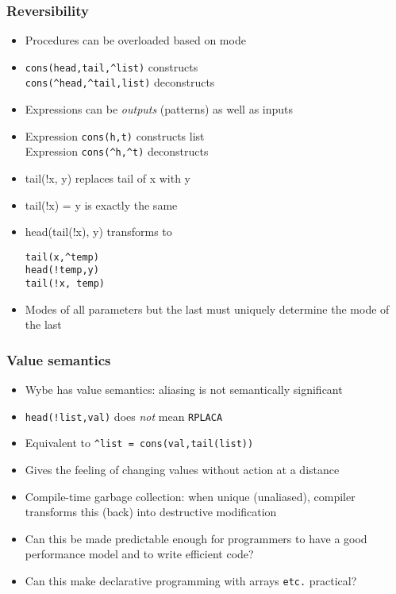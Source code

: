 \documentclass[12pt]{beamer}
\begin{document}
\begin{frame}[fragile]
\frametitle{Reversibility}
\begin{itemize}
\item Procedures can be overloaded based on mode
\item \texttt{cons(head,tail,\^{ }list)}  constructs \\
\texttt{cons(\^{ }head,\^{ }tail,list)}  deconstructs \\
\item Expressions can be \emph{outputs} (patterns) as well as inputs
\item Expression \texttt{cons(h,t)} constructs list \\
Expression \texttt{cons(\^{ }h,\^{ }t)} deconstructs
\item tail(!x, y) replaces tail of x with y
\item tail(!x) = y is exactly the same
\item head(tail(!x), y) \quad transforms to \quad
  \begin{minipage}[c]{0.4\linewidth}
  \texttt{tail(x,\^{ }temp)} \\
  \texttt{head(!temp,y)} \\
  \texttt{tail(!x, temp)}
  \end{minipage}
\item Modes of all parameters but the last must uniquely determine the
  mode of the last
\end{itemize}
\end{frame}


\begin{frame}[fragile]
\frametitle{Value semantics}
\begin{itemize}
\item Wybe has value semantics:  aliasing is not semantically significant
\item \texttt{head(!list,val)} does \emph{not} mean \texttt{RPLACA}
\item Equivalent to \texttt{\^{ }list = cons(val,tail(list))}
\item Gives the feeling of changing values without action at a distance
\item Compile-time garbage collection:  when unique (unaliased),
  compiler transforms this (back) into destructive modification
\item Can this be made predictable enough for programmers
  to have a good performance model and to write efficient code?
\item Can this make declarative programming with arrays \texttt{etc.} practical?
\end{itemize}
\end{frame}
\end{document}
